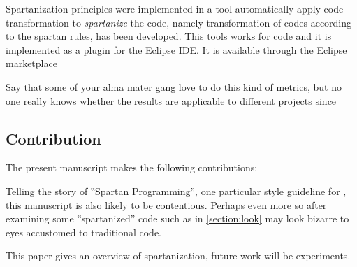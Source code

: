 Spartanization principles were implemented in a tool automatically apply code
transformation to \emph{spartanize} the code, namely transformation of codes
according to the spartan rules, has been developed.
This tools works for \Java code and it is implemented as a plugin for the Eclipse
IDE\@. It is available through the Eclipse marketplace

Say that some of your alma mater gang love to do this kind of metrics, but
no one really knows whether the results are applicable to different projects
since~\cite{Turnu:Concas:Marchesi:Tonelli:11}


\subsection{Contribution}

The present manuscript makes the following contributions:


Telling the story of ‟Spartan Programming”, one particular style guideline for
\Java, this manuscript is also likely to be contentious. Perhaps even more so
after examining some ‟spartanized” code such as in \cref{section:look}
may look bizarre to eyes accustomed to traditional \Java code.



This paper gives an overview of spartanization, future work will be
experiments.
